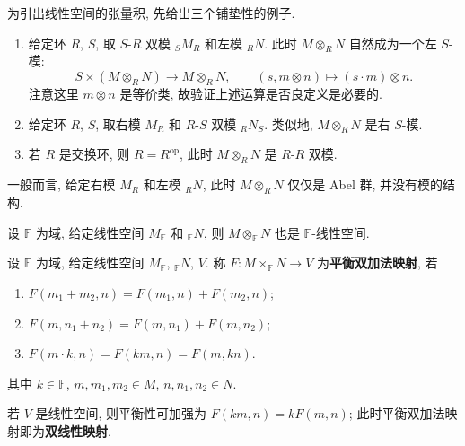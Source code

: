 为引出线性空间的张量积, 先给出三个铺垫性的例子.

\begin{example}\label{ex:tensor-module-structure}
\mbox{}\par\vspace{-0.2em}
\begin{enumerate}
\item 给定环 $R$, $S$, 取 $S$-$R$ 双模 ${}_S M_R$ 和左模 ${}_R N$.
此时 $M\otimes_R N$ 自然成为一个左 $S$-模:
\[
  S\times(M\otimes_R N)\longrightarrow M\otimes_R N,\qquad (s,m\otimes n)\longmapsto (s\cdot m)\otimes n .
\]
注意这里 $m\otimes n$ 是等价类, 故验证上述运算是否良定义是必要的.

\item 给定环 $R$, $S$, 取右模 $M_R$ 和 $R$-$S$ 双模 ${}_R N_S$.
类似地, $M\otimes_R N$ 是右 $S$-模.

\item 若 $R$ 是交换环, 则 $R=R^{\mathrm{op}}$, 此时 $M\otimes_R N$ 是 $R$-$R$ 双模.
\end{enumerate}
\end{example}

\begin{remark}\label{rem:tensor-no-module}
一般而言, 给定右模 $M_R$ 和左模 ${}_R N$, 此时 $M\otimes_R N$ 仅仅是 Abel 群, 并没有模的结构.
\end{remark}

\begin{proposition}\label{prop:tensor-vector-space}
设 $\mathbb{F}$ 为域, 给定线性空间 $M_{\mathbb{F}}$ 和 ${}_{\mathbb{F}} N$, 则 $M\otimes_{\mathbb{F}} N$ 也是 $\mathbb{F}$-线性空间.
\end{proposition}

\begin{definition}[平衡双加法映射]\label{def:bilinear}
设 $\mathbb{F}$ 为域, 给定线性空间 $M_{\mathbb{F}}$, ${}_{\mathbb{F}} N$, $V$.
称 $F\colon M\times_{\mathbb{F}} N\to V$ 为\textbf{平衡双加法映射}, 若
\begin{enumerate}[label=(\arabic*)]
  \item $F(m_1+m_2,n)=F(m_1,n)+F(m_2,n)$;
  \item $F(m,n_1+n_2)=F(m,n_1)+F(m,n_2)$;
  \item $F(m\cdot k,n)=F(km,n)=F(m,kn)$.
\end{enumerate}
其中 $k\in \mathbb{F}$, $m,m_1,m_2\in M$, $n,n_1,n_2\in N$.
\end{definition}

\begin{remark}\label{rem:bilinear}
若 $V$ 是线性空间, 则平衡性可加强为 $F(km,n)=kF(m,n)$;
此时平衡双加法映射即为\textbf{双线性映射}.
\end{remark}

